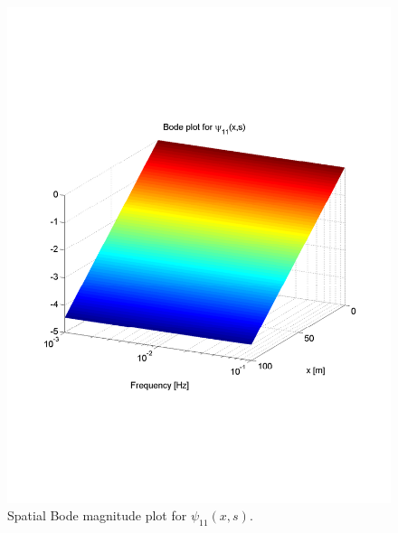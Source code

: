 \documentclass[preprint]{elsarticle}
\begin{document}
\begin{figure}[H]
\centering
\includegraphics[trim = 0mm 60mm 0mm 60mm, width = 120mm]{distr11_-3to-1}
\caption{Spatial Bode magnitude plot for $\psi_{11}(x,s)$.}
\end{figure}
\end{document}
